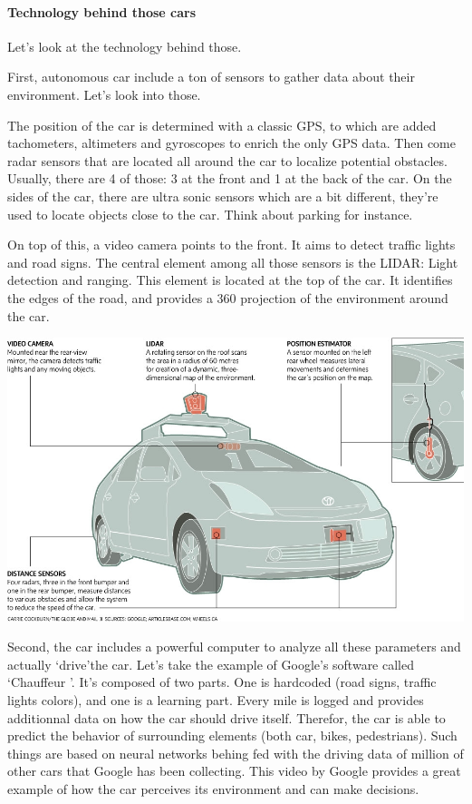 \documentclass[12pt]{article}
\begin{document}
\paragraph{Technology behind those cars}

Let's look at the technology behind those.

First, autonomous car include a ton of sensors to gather data about their
environment. Let's look into those.

The position of the car is determined with a classic GPS, to which are added
tachometers, altimeters and gyroscopes to enrich the only GPS data. Then come
radar sensors that are located all around the car to localize potential
obstacles. Usually, there are 4 of those: 3 at the front and 1 at the back of
the car. On the sides of the car, there are ultra sonic sensors which are a bit
different, they're used to locate objects close to the car. Think about parking
for instance.

\noindent On top of this, a video camera points to the front. It aims to detect
traffic lights and road signs. The central element among all those sensors is
the LIDAR: Light detection and ranging. This element is located at the top of
the car. It identifies the edges of the road, and provides a 360 projection of
the environment around the car.

\vspace{5mm}
\includegraphics[width=\textwidth]{car-diagram}
\vspace{5mm}

Second, the car includes a powerful computer to analyze all these parameters
and actually \lq drive\rq the car. Let's take the example of Google's software
called \lq Chauffeur \rq . It's composed of two parts. One is hardcoded
(road signs, traffic lights colors), and one is a learning part. Every mile is
logged and provides additionnal data on how the car should drive itself.
Therefor, the car is able to predict the behavior of surrounding elements
(both car, bikes, pedestrians). Such things are based on neural networks behing
fed with the driving data of million of other cars
that Google has been collecting. This video by Google provides a great example
of how the car perceives its environment and can make decisions.
\end{document}

